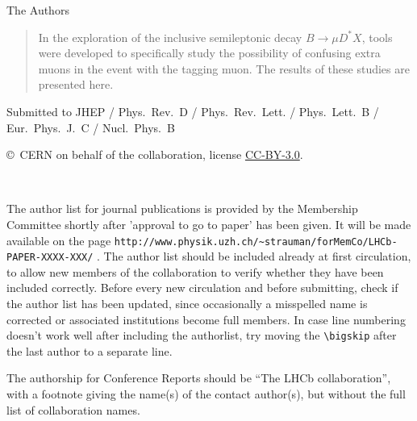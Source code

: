 \begin{titlepage}
\begin{center}
The Authors%
\end{center}

\vspace{\fill}

\begin{abstract}
  \noindent
In the exploration of the inclusive semileptonic decay $B\to\mu D^*X$, tools were developed to specifically study the possibility of confusing extra muons in the event with the tagging muon. The results of these studies are presented here.  
\end{abstract}

\vspace*{2.0cm}

\begin{center}
  Submitted to JHEP / Phys.~Rev.~D / Phys.~Rev.~Lett. / Phys.~Lett.~B / Eur.~Phys.~J.~C / Nucl.~Phys.~B 
\end{center}

\vspace{\fill}

{\footnotesize 
\centerline{\copyright~CERN on behalf of the \lhcb collaboration, license \href{http://creativecommons.org/licenses/by/3.0/}{CC-BY-3.0}.}}
\vspace*{2mm}

\end{titlepage}



\newpage
\setcounter{page}{2}
\mbox{~}
\newpage



The author list for journal publications is provided by the Membership Committee shortly after 'approval to go to paper' has been given.
It will be made available on the page
\verb!http://www.physik.uzh.ch/~strauman/forMemCo/LHCb-PAPER-XXXX-XXX/! .
The author list should be included already at first circulation, 
to allow new members of the collaboration to verify whether they have been included correctly.
Before every new circulation and before submitting, check if the author list has been updated, since occasionally a misspelled name 
is corrected or associated institutions become full members.
In case line numbering doesn't work well after including the authorlist, try moving the \verb!\bigskip! after the last author to a separate line.


The authorship for Conference Reports should be ``The LHCb
  collaboration'', with a footnote giving the name(s) of the contact
  author(s), but without the full list of collaboration names.



\cleardoublepage







